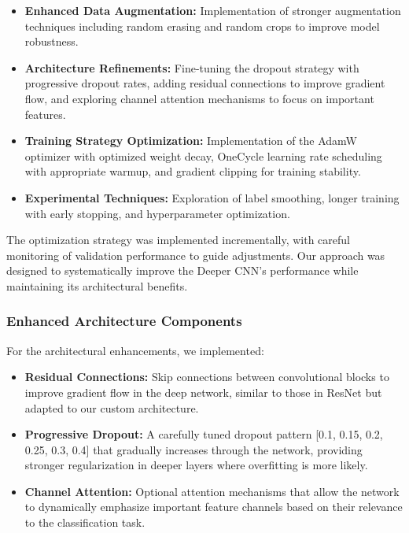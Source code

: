 \begin{itemize}
    \item \textbf{Enhanced Data Augmentation:} Implementation of stronger augmentation techniques including random erasing and random crops to improve model robustness.
    
    \item \textbf{Architecture Refinements:} Fine-tuning the dropout strategy with progressive dropout rates, adding residual connections to improve gradient flow, and exploring channel attention mechanisms to focus on important features.
    
    \item \textbf{Training Strategy Optimization:} Implementation of the AdamW optimizer with optimized weight decay, OneCycle learning rate scheduling with appropriate warmup, and gradient clipping for training stability.
    
    \item \textbf{Experimental Techniques:} Exploration of label smoothing, longer training with early stopping, and hyperparameter optimization.
\end{itemize}

The optimization strategy was implemented incrementally, with careful monitoring of validation performance to guide adjustments. Our approach was designed to systematically improve the Deeper CNN's performance while maintaining its architectural benefits.

\subsubsection{Enhanced Architecture Components}
For the architectural enhancements, we implemented:

\begin{itemize}
    \item \textbf{Residual Connections:} Skip connections between convolutional blocks to improve gradient flow in the deep network, similar to those in ResNet but adapted to our custom architecture.
    
    \item \textbf{Progressive Dropout:} A carefully tuned dropout pattern [0.1, 0.15, 0.2, 0.25, 0.3, 0.4] that gradually increases through the network, providing stronger regularization in deeper layers where overfitting is more likely.
    
    \item \textbf{Channel Attention:} Optional attention mechanisms that allow the network to dynamically emphasize important feature channels based on their relevance to the classification task.
\end{itemize}

